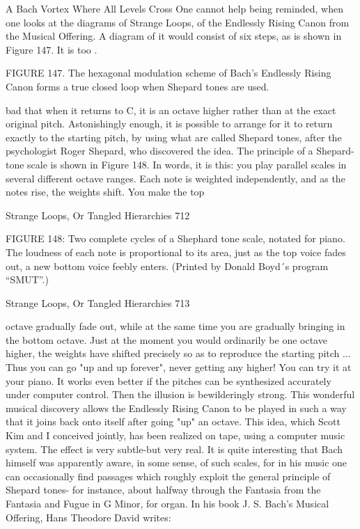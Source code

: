                      A Bach Vortex Where All Levels Cross
One cannot help being reminded, when one looks at the diagrams of Strange Loops, of
the Endlessly Rising Canon from the Musical Offering. A diagram of it would consist of
six steps, as is shown in Figure 147. It is too .




   FIGURE 147. The hexagonal modulation scheme of Bach's Endlessly Rising Canon
               forms a true closed loop when Shepard tones are used.

bad that when it returns to C, it is an octave higher rather than at the exact original pitch.
Astonishingly enough, it is possible to arrange for it to return exactly to the starting pitch,
by using what are called Shepard tones, after the psychologist Roger Shepard, who
discovered the idea. The principle of a Shepard-tone scale is shown in Figure 148. In
words, it is this: you play parallel scales in several different octave ranges. Each note is
weighted independently, and as the notes rise, the weights shift. You make the top




Strange Loops, Or Tangled Hierarchies                                                      712

FIGURE 148: Two complete cycles of a Shephard tone scale, notated for piano. The
loudness of each note is proportional to its area, just as the top voice fades out, a new
bottom voice feebly enters. (Printed by Donald Boyd´s program “SMUT”.)


Strange Loops, Or Tangled Hierarchies                                                       713

octave gradually fade out, while at the same time you are gradually bringing in the
bottom octave. Just at the moment you would ordinarily be one octave higher, the
weights have shifted precisely so as to reproduce the starting pitch ... Thus you can go
"up and up forever", never getting any higher! You can try it at your piano. It works even
better if the pitches can be synthesized accurately under computer control. Then the
illusion is bewilderingly strong.
         This wonderful musical discovery allows the Endlessly Rising Canon to be played
in such a way that it joins back onto itself after going "up" an octave. This idea, which
Scott Kim and I conceived jointly, has been realized on tape, using a computer music
system. The effect is very subtle-but very real. It is quite interesting that Bach himself
was apparently aware, in some sense, of such scales, for in his music one can
occasionally find passages which roughly exploit the general principle of Shepard tones-
for instance, about halfway through the Fantasia from the Fantasia and Fugue in G Minor,
for organ.
         In his book J. S. Bach's Musical Offering, Hans Theodore David writes:

